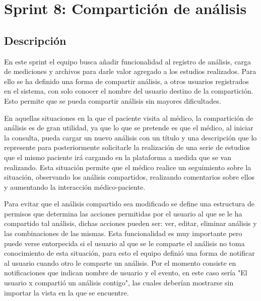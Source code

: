 \section{Sprint 8: Compartición de análisis} %



\subsection{Descripción}

En este sprint el equipo busca añadir funcionalidad al registro de análisis, carga de mediciones y archivos para darle valor agregado a los estudios realizados. Para ello se ha definido una forma de compartir análisis, a otros usuarios registrados en el sistema, con solo conocer el nombre del usuario destino de la compartición. Esto permite que se pueda compartir análisis sin mayores dificultades. 
 
En aquellas situaciones en la que el paciente visita al médico, la compartición de análisis es de gran utilidad, ya que lo que se pretende es que el médico, al iniciar la consulta, pueda cargar un nuevo análisis con un título y una descripción que lo represente para posteriormente solicitarle la realización de una serie de estudios que el mismo paciente irá cargando en la plataforma a medida que se van realizando. Esta situación permite que el médico realice un seguimiento sobre la situación, observando los análisis compartidos, realizando comentarios sobre ellos y aumentando la interacción médico-paciente.


 
 Para evitar que el análisis compartido sea modificado se define una estructura de permisos que determina las acciones permitidas por el usuario al que se le ha compartido tal análisis, dichas acciones pueden ser: ver, editar, eliminar análisis y las combinaciones de las mismas. Esta funcionalidad es muy importante pero puede verse entorpecida si el usuario al que se le comparte el análisis no toma conocimiento de esta situación, para esto el equipo definió una forma de notificar al usuario cuando otro le comparte un análisis. Por el momento consiste en notificaciones que indican nombre de usuario y el evento, en este caso sería "El usuario x compartió un análisis contigo", las cuales deberían mostrarse sin importar la vista en la que se encuentre.
 
